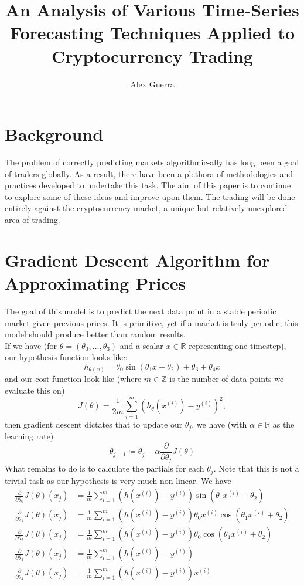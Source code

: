 \documentclass{article}
\title{An Analysis of Various Time-Series Forecasting Techniques Applied to Cryptocurrency Trading}
\author{Alex Guerra}
\newcommand{\Z}{\mathbb{Z}}
\newcommand{\R}{\mathbb{R}}
\begin{document}
\maketitle
\section*{Background}
The problem of correctly predicting markets algorithmic-ally has long been a goal of traders globally.  As a result, there have been a plethora of methodologies and practices developed to undertake this task. The aim of this paper is to continue to explore some of these ideas and improve upon them. The trading will be done entirely against the cryptocurrency market, a unique but relatively unexplored area of trading. 
\section*{Gradient Descent Algorithm for Approximating Prices}
The goal of this model is to predict the next data point in a stable periodic market given previous prices. It is primitive, yet if a market is truly periodic, this model should produce better than random results. \\\newline
If we have (for $\theta = (\theta_0,\ldots, \theta_3)$ and a scalar $x\in\R$ representing one timestep), our hypothesis function looks like:
$$
h_{\theta(x)} = \theta_0 \sin \left( \theta_1 x + \theta_2 \right) +\theta_3 + \theta_4 x
$$
and our cost function look like (where $m\in\Z$ is the number of data points we evaluate this on)
$$
J(\theta) = \frac{1}{2m} \sum_{i = 1}^m \left( h_{\theta} \left(x^{(i)}\right) - y^{(i)} \right)^2,
$$
then gradient descent dictates that to update our $\theta_j$, we have (with $\alpha\in\R$ as the learning rate)
$$
\theta_{j+1} \coloneqq \theta_j - \alpha \frac{\partial }{\partial \theta_j} J(\theta)
$$
What remains to do is to calculate the partials for each $\theta_j$. Note that this is not a trivial task as our hypothesis is very much non-linear. We have 
\begin{equation*}
\begin{split}
\frac{\partial}{\partial \theta_0} J(\theta)(x_j) &= \frac{1}{m} \sum_{i =1}^m \left ( h(x^{(i)}) - y^{(i)} \right ) \sin \left( \theta_1 x^{(i)} + \theta_2 \right ) \\
\frac{\partial}{\partial \theta_1} J(\theta)(x_j) &= \frac{1}{m} \sum_{i =1}^m \left ( h(x^{(i)}) - y^{(i)} \right ) \theta_0 x^{(i)}\cos \left( \theta_1 x^{(i)} + \theta_2 \right)  \\
\frac{\partial}{\partial \theta_2} J(\theta)(x_j) &= \frac{1}{m} \sum_{i =1}^m \left ( h(x^{(i)}) - y^{(i)} \right ) \theta_0 \cos \left ( \theta_1 x^{(i)}+ \theta_2 \right ) \\
\frac{\partial}{\partial \theta_3} J(\theta)(x_j) &= \frac{1}{m} \sum_{i =1}^m \left ( h(x^{(i)}) - y^{(i)} \right ) \\
\frac{\partial}{\partial \theta_4} J(\theta)(x_j) &= \frac{1}{m} \sum_{i=1}^m \left (h(x^{(i)}) - y^{(i)} \right ) x^ {(i)}
\end{split}
\end{equation*}
\end{document}
